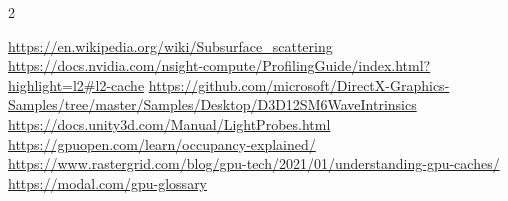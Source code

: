 \documentclass[14pt]{article}
\begin{document}

\begin{thebibliography}{2}

	 \url{https://en.wikipedia.org/wiki/Subsurface_scattering}
	 \url{https://docs.nvidia.com/nsight-compute/ProfilingGuide/index.html?highlight=l2#l2-cache}
	 \url{https://github.com/microsoft/DirectX-Graphics-Samples/tree/master/Samples/Desktop/D3D12SM6WaveIntrinsics}
	 \url{https://docs.unity3d.com/Manual/LightProbes.html}
	 \url{https://gpuopen.com/learn/occupancy-explained/}
	 \url{https://www.rastergrid.com/blog/gpu-tech/2021/01/understanding-gpu-caches/}
	 \url{https://modal.com/gpu-glossary}
\end{thebibliography}

\end{document}
